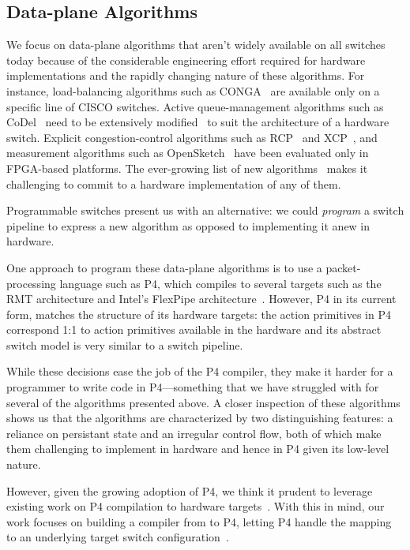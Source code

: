 \subsection{Data-plane Algorithms}
\label{ss:data-plane}
 We focus on data-plane algorithms that aren't widely available on all switches
today because of the considerable engineering effort required for hardware
implementations and the rapidly changing nature of these algorithms. For
instance, load-balancing algorithms such as CONGA~\cite{conga} are available
only on a specific line of CISCO switches.  Active queue-management algorithms
such as CoDel~\cite{codel} need to be extensively modified~\cite{pie} to suit
the architecture of a hardware switch.  Explicit congestion-control algorithms
such as RCP~\cite{rcp} and XCP~\cite{xcp}, and measurement algorithms such as
OpenSketch~\cite{opensketch} have been evaluated only in FPGA-based platforms.
The ever-growing list of new algorithms~\cite{pdq, d3, detail} makes it
challenging to commit to a hardware implementation of any of them.

 Programmable switches present us with an alternative: we could
\textit{program} a switch pipeline to express a new algorithm as opposed to
implementing it anew in hardware.

One approach to program these data-plane algorithms is to use a
packet-processing language such as P4, which compiles to several targets such
as the RMT architecture and Intel's FlexPipe
architecture~\cite{lavanya_compiler}. However, P4 in its current form, matches
the structure of its hardware targets: the action primitives in P4 correspond
1:1 to action primitives available in the hardware and its abstract switch
model is very similar to a switch pipeline.

While these decisions ease the job of the P4 compiler, they make it harder for
a programmer to write code in P4---something that we have struggled with for
several of the algorithms presented above. A closer inspection of these
algorithms shows us that the algorithms are characterized by two distinguishing
features: a reliance on persistant state and an irregular control flow, both of
which make them challenging to implement in hardware and hence in P4 given its
low-level nature.

However, given the growing adoption of P4, we think it prudent to leverage
existing work on P4 compilation to hardware targets~\cite{netronome, xilinx}.
With this in mind, our work focuses on building a compiler from \pktlanguage to
P4, letting P4 handle the mapping to an underlying target switch
configuration~\cite{lavanya_compiler}.
